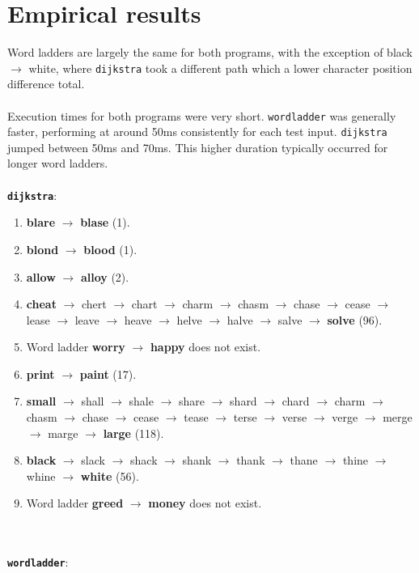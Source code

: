 \documentclass{article}
\begin{document}
\section*{Empirical results}

Word ladders are largely the same for both programs, with the exception of black $\rightarrow$ white, where \texttt{dijkstra} took a different path which a lower character position difference total.
\\\\
Execution times for both programs were very short. \texttt{wordladder} was generally faster, performing at around 50ms consistently for each test input. \texttt{dijkstra} jumped between 50ms and 70ms. This higher duration typically occurred for longer word ladders.
\\\\
\texttt{\textbf{dijkstra}}:

\begin{enumerate}
    \item \textbf{blare} $\rightarrow$ \textbf{blase} (1).
    \item \textbf{blond} $\rightarrow$ \textbf{blood} (1).
    \item \textbf{allow} $\rightarrow$ \textbf{alloy} (2).
    \item \textbf{cheat} $\rightarrow$ chert $\rightarrow$ chart $\rightarrow$ charm $\rightarrow$ chasm $\rightarrow$ chase $\rightarrow$ cease $\rightarrow$ lease $\rightarrow$ leave $\rightarrow$ heave $\rightarrow$ helve $\rightarrow$ halve $\rightarrow$ salve $\rightarrow$ \textbf{solve} (96).
    \item Word ladder \textbf{worry} $\rightarrow$ \textbf{happy} does not exist.
    \item \textbf{print} $\rightarrow$ \textbf{paint} (17).
    \item \textbf{small} $\rightarrow$ shall $\rightarrow$ shale $\rightarrow$ share $\rightarrow$ shard $\rightarrow$ chard $\rightarrow$ charm $\rightarrow$ chasm $\rightarrow$ chase $\rightarrow$ cease $\rightarrow$ tease $\rightarrow$ terse $\rightarrow$ verse $\rightarrow$ verge $\rightarrow$ merge $\rightarrow$ marge $\rightarrow$ \textbf{large} (118).
    \item \textbf{black} $\rightarrow$ slack $\rightarrow$ shack $\rightarrow$ shank $\rightarrow$ thank $\rightarrow$ thane $\rightarrow$ thine $\rightarrow$ whine $\rightarrow$ \textbf{white} (56).
    \item Word ladder \textbf{greed} $\rightarrow$ \textbf{money} does not exist.
\end{enumerate}
\\\\
\texttt{\textbf{wordladder}}:
\end{document}
